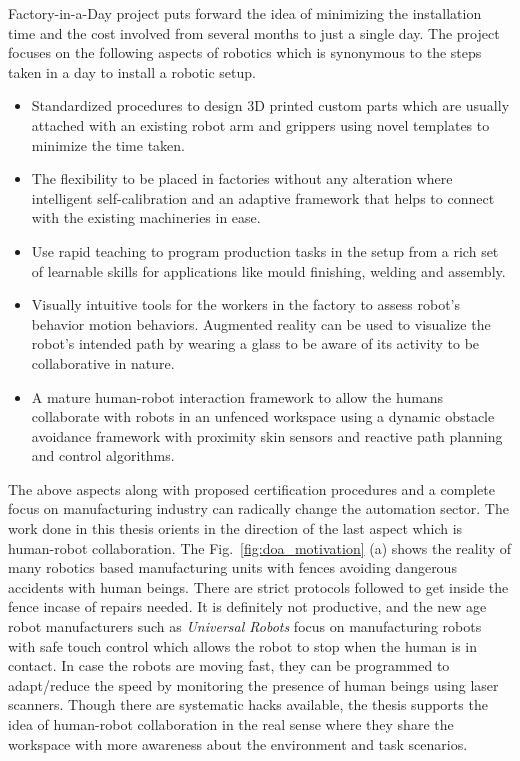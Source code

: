 Factory-in-a-Day project puts forward the idea of minimizing the installation time and the cost involved from several months to just a single day. The project focuses on the following aspects of robotics which is synonymous to the steps taken in a day to install a robotic setup. 

\begin{itemize}
\item Standardized procedures to design 3D printed custom parts which are usually attached with an existing robot arm and grippers using novel templates to minimize the time taken.
\item The flexibility to be placed in factories without any alteration where intelligent self-calibration and an adaptive framework that helps to connect with the existing machineries in ease.
\item Use rapid teaching to program production tasks in the setup from a rich set of learnable skills
for applications like mould finishing, welding and assembly.
\item Visually intuitive tools for the workers in the factory to assess robot's behavior motion behaviors. Augmented reality can be used to visualize the robot's intended path by wearing a glass to be aware of its activity to be collaborative in nature.
\item A mature human-robot interaction framework to allow the humans collaborate with robots in an unfenced workspace using a dynamic obstacle avoidance framework with proximity skin sensors and 
reactive path planning and control algorithms.
\end{itemize}
The above aspects along with proposed certification procedures and a complete focus on manufacturing industry can radically change the automation sector. The work done in this thesis orients in the direction of the last aspect which is human-robot collaboration. The Fig.~\ref{fig:doa_motivation} (a) shows the reality of many robotics based manufacturing units with fences avoiding dangerous accidents with human beings. There are strict protocols followed to get inside the fence incase of repairs needed. It is definitely not productive, and the new age robot manufacturers such as \textit{Universal Robots} focus on manufacturing robots with safe touch control which allows the robot to stop when the human is in contact. In case the robots are moving fast, they can be programmed to adapt/reduce the speed by monitoring the presence of human beings using laser scanners. Though there are systematic hacks available, the thesis supports the idea of human-robot collaboration in the real sense where they share the workspace with more awareness about the environment and task scenarios. 
